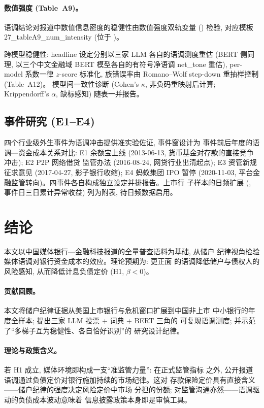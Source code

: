 \paragraph{数值强度 (Table~A9)。}
语调结论对报道中数值信息密度的稳健性由数值强度双轨变量
() 检验, 对应模板
27\_tableA9\_num\_intensity (位于
)。

跨模型稳健性: headline 设定分别以三家 LLM 各自的语调测度重估
(BERT 侧同理, 以三个中文金融域 BERT 模型各自的有符号净语调
net\_tone 重估), per-model 系数一律 $z$-score 标准化,
族错误率由 Romano--Wolf step-down 重抽样控制 (Table~A12)。
模型间一致性诊断 (Cohen's $\kappa$, 非负码重映射后计算;
Krippendorff's $\alpha$, 缺标感知) 随表一并报告。

\subsection{事件研究 (E1--E4)}
四个行业级外生事件为语调冲击提供准实验佐证, 事件窗设计为
事件前后年度的语调—资金成本关系对比: E1 余额宝上线
(2013-06-13, 货币基金对存款的直接竞争冲击); E2 P2P 网络借贷
监管办法 (2016-08-24, 网贷行业出清起点); E3 资管新规征求意见
(2017-04-27, 影子银行收缩); E4 蚂蚁集团 IPO 暂停 (2020-11-03,
平台金融监管转向)。四事件各自构成独立设定并排报告。上市行
子样本的日频扩展 (,
事件日三日累计异常收益) 列为附表, 待日频数据启用。

\section{结论}\label{sec:concl}

本文以中国媒体银行—金融科技报道的全量普查语料为基础, 从储户
纪律视角检验媒体语调对银行资金成本的效应。理论预期为: 更正面
的语调降低储户与债权人的风险感知, 从而降低计息负债定价
(H1, $\beta<0$)。

\paragraph{贡献回顾。}
本文将储户纪律证据从美国上市银行与危机窗口扩展到中国非上市
中小银行的年度全样本; 提出三家 LLM 投票 + 词典 + BERT 三角的
可复现语调测度; 并示范了``多梯子互为稳健性、各自恰好识别''的
研究设计纪律。

\paragraph{理论与政策含义。}
若 H1 成立, 媒体环境即构成一支``准监管力量'': 在正式监管指标
之外, 公开报道语调通过负债定价对银行施加持续的市场纪律。这对
存款保险定价具有直接含义——储户纪律的强度决定风险定价中市场
分担的份额; 对监管沟通亦然——语调驱动的负债成本波动意味着
信息披露政策本身即是审慎工具。

